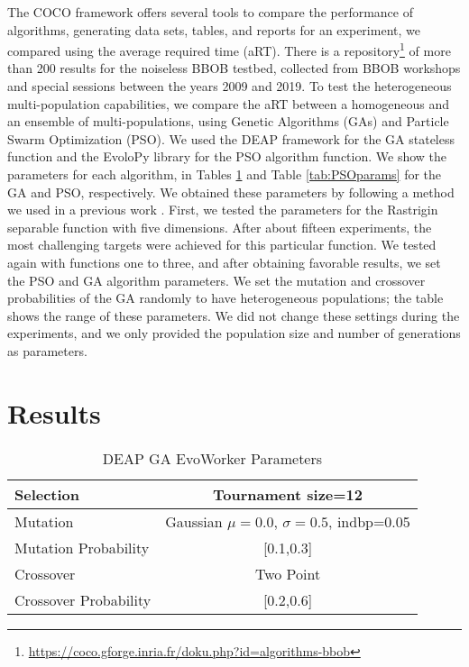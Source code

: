 The COCO framework offers several tools to compare the performance of
algorithms, generating data sets, tables, and reports for an experiment, we
compared using the average required time (aRT). There is a
repository\footnote{\url{https://coco.gforge.inria.fr/doku.php?id=algorithms-bbob}}
of more than 200 results for the noiseless BBOB testbed, collected from BBOB
workshops and special sessions between the years 2009 and 2019. To test the
heterogeneous multi-population capabilities, we compare the aRT between a
homogeneous and an ensemble of multi-populations, using Genetic Algorithms
(GAs) and Particle Swarm Optimization (PSO). We used the DEAP framework for the
GA stateless function \cite{fortin2012deap} and the EvoloPy library
\cite{faris2016evolopy} for the PSO algorithm function. We show the parameters
for each algorithm, in Tables \ref{tab:GAparams} and Table \ref{tab:PSOparams}
for the GA and PSO, respectively. We obtained these parameters by following a
method we used in a previous work \cite{garcia2017benchmarking}. First, we
tested the parameters for the Rastrigin separable function with five
dimensions. After about fifteen experiments, the most challenging targets were
achieved for this particular function. We tested again with functions one to
three, and after obtaining favorable results, we set the PSO and GA algorithm
parameters. We set the mutation and crossover probabilities of the GA randomly
to have heterogeneous populations; the table shows the range of these
parameters. We did not change these settings during the experiments, and we
only provided the population size and number of generations as parameters.

\section{Results}
\label{results}

\begin{table}
    \small
    \caption{ DEAP GA EvoWorker Parameters }
    \label{tab:GAparams} 
    \centering
    \small
    \begin{tabular}{|l|c|}
      \hline
      Selection & Tournament size=12                            \\ \hline
      Mutation & Gaussian $\mu=0.0$, $\sigma=0.5$, indbp=0.05   \\ \hline
      Mutation Probability & [0.1,0.3]                          \\ \hline
      Crossover & Two Point                                     \\ \hline
      Crossover Probability  & [0.2,0.6]                          \\ \hline
    \end{tabular}
  \end{table}
  
